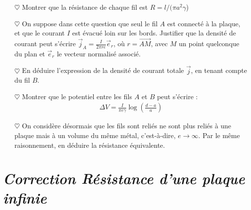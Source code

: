 \documentclass{report}
\begin{document}
\begin{itemize}

	\item[$\heartsuit$] Montrer que la résistance de chaque fil est $R=l/(\pi a^2\gamma$)
	
	\item[$\heartsuit$] On suppose dans cette question que seul le fil $A$ est connecté à la plaque, et que le courant $I$ est évacué loin sur les bords. Justifier que la densité de courant peut s'écrire $\vec{j}_A=\frac{I}{2\pi r e}\vec{e}_r$, où $r=\vec{AM}$, avec $M$ un point quelconque du plan et  $\vec{e}_r$ le vecteur normalisé associé.
	
	\item[$\heartsuit$] En déduire l'expression de la densité de courant totale $\vec{j}$, en tenant compte du fil $B$.
	
	\item[$\heartsuit$] Montrer que le potentiel entre les fils $A$ et $B$ peut s'écrire :
	\begin{align*}
		\Delta V = \frac{I}{\pi e\gamma}\log\left(\frac{d-a}{a} \right) 
	\end{align*}
	
	\item[$\heartsuit$] On considère désormais que les fils sont reliés ne sont plus reliés à une plaque mais à un volume du même métal, c'est-à-dire, $e\longrightarrow\infty$. Par le même raisonnement, en déduire la résistance équivalente. 

\end{itemize}

\newpage

\section*{\textit{Correction Résistance d'une plaque infinie}}
\end{document}
